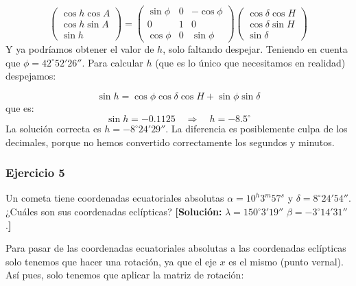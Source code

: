\begin{equation}
	\begin{pmatrix}
		\cos h \cos A \\
		\cos h \sin A \\
		\sin h
	\end{pmatrix} =\begin{pmatrix}
		\sin \phi & 0 & - \cos \phi \\
		0         & 1 & 0           \\
		\cos \phi & 0 & \sin \phi
	\end{pmatrix}
	\begin{pmatrix}
		\cos \delta \cos H \\
		\cos \delta \sin H \\
		\sin \delta
	\end{pmatrix}
\end{equation}
Y ya podríamos obtener el valor de $h$, solo faltando despejar. Teniendo en cuenta que $\phi=42^\circ52'26''$. Para calcular $h$ (que es lo único que necesitamos en realidad) despejamos:

\begin{equation}
	\sin h = \cos \phi \cos \delta \cos H + \sin \phi \sin \delta
\end{equation}
que es:
\begin{equation}
	\sin h = -0.1125 \quad \Longrightarrow \quad h = -8.5^{\circ}
\end{equation}
La solución correcta es $h = -8^\circ24'29''$. La diferencia es posiblemente culpa de los decimales, porque no hemos convertido correctamente los segundos y minutos.



\begin{Enunciado}
	\subsubsection{Ejercicio 5}
	Un cometa tiene coordenadas ecuatoriales absolutas $\alpha = 10^{h}3^{m}57^{s}$ y $\delta = 8^\circ24'54''$. ¿Cuáles son sus coordenadas eclípticas?
	\textbf{[Solución:} $\lambda = 150^\circ3'19''$	$\beta = -3^\circ14'31''$.\textbf{]}


\end{Enunciado}
Para pasar de las coordenadas ecuatoriales absolutas a las coordenadas eclípticas solo tenemos que hacer una rotación, ya que el eje $x$ es el mismo (punto vernal). Así pues, solo tenemos que aplicar la matriz de rotación:


